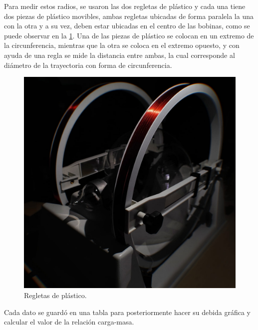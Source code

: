 Para medir estos radios, se usaron las dos regletas de plástico y cada una
tiene dos piezas de plástico movibles, ambas regletas ubicadas de forma paralela
la una con la otra y a su vez, deben estar ubicadas en el centro de las bobinas,
como se puede observar en la \cref{fig:reglas}.
Una de las piezas de plástico se colocan en un extremo de la circunferencia,
mientras que la otra se coloca en el extremo opuesto, y con ayuda de una regla
se mide la distancia entre ambas, la cual corresponde al diámetro de la
trayectoria con forma de circunferencia.

\begin{figure}[htbp!]
  \centering
  \includegraphics[width=0.8\linewidth]{./images/reglas.jpeg}
  \caption{Regletas de plástico.}
  \label{fig:reglas}
\end{figure}

Cada dato se guardó en una tabla para posteriormente hacer su debida gráfica y
calcular el valor de la relación carga-masa.
